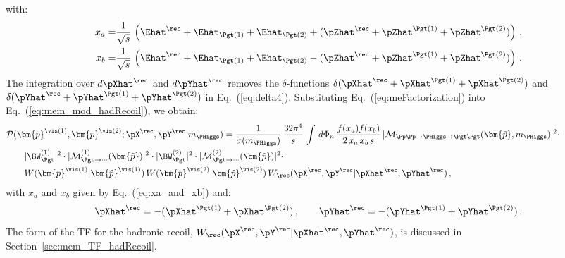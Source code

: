 with:
\begin{align}
x_{a} = & \frac{1}{\sqrt{s}} \, \left( \Ehat^{\rec} + \Ehat_{\Pgt(1)} +
\Ehat_{\Pgt(2)} + (\pZhat^{\rec} + \pZhat^{\Pgt(1)} +
\pZhat^{\Pgt(2)}) \right)
\, , \nonumber \\
x_{b} = & \frac{1}{\sqrt{s}} \, \left( \Ehat^{\rec} + \Ehat_{\Pgt(1)}
  + \Ehat_{\Pgt(2)} - (\pZhat^{\rec} + \pZhat^{\Pgt(1)} +
  \pZhat^{\Pgt(2)}) \right) \, .
\label{eq:xa_and_xb}
\end{align}
The integration over $d\pXhat^{\rec}$ and $d\pYhat^{\rec}$ removes the $\delta$-functions 
$\delta( \pXhat^{\rec} + \pXhat^{\Pgt(1)} + \pXhat^{\Pgt(2)} )$ and
$\delta( \pYhat^{\rec} + \pYhat^{\Pgt(1)} + \pYhat^{\Pgt(2)} )$ in Eq.~(\ref{eq:delta4}).
Substituting Eq.~(\ref{eq:meFactorization}) into Eq.~(\ref{eq:mem_mod_hadRecoil}), we obtain:
\begin{align}
&
\mathcal{P}(\bm{p}^{\vis(1)},\bm{p}^{\vis(2)};\pX^{\rec},\pY^{\rec}|m_{\PHiggs})
= \frac{1}{\sigma(m_{\PHiggs})} \, \frac{32\pi^{4}}{s} \, \int \,
 d\Phi_{n} \, \frac{f(x_{a}) f(x_{b})}{2 \, x_{a} \, x_{b} \, s} \, 
 \vert \mathcal{M}_{\Pp\Pp \to \PHiggs \to \Pgt\Pgt}(\bm{\tilde{p}},m_{\PHiggs}) \vert^{2} \cdot \hspace{2cm} \nonumber \\
& \qquad \vert \BW^{(1)}_{\Pgt} \vert^{2} \cdot \vert \mathcal{M}^{(1)}_{\Pgt\to\cdots}(\bm{\tilde{p}}) \vert^{2} 
 \cdot \vert \BW^{(2)}_{\Pgt} \vert^{2} \cdot \vert \mathcal{M}^{(2)}_{\Pgt\to\cdots}(\bm{\tilde{p}}) \vert^{2} \cdot \nonumber \\
& \qquad W(\bm{p}^{\vis(1)}|\bm{\hat{p}}^{\vis(1)}) \, W(\bm{p}^{\vis(2)}|\bm{\hat{p}}^{\vis(2)}) \, W_{\rec}( \pX^{\rec},\pY^{\rec} | \pXhat^{\rec},\pYhat^{\rec} ) \, ,
\label{eq:mem_with_hadRecoil}
\end{align}
with $x_{a}$ and $x_{b}$ given by Eq.~(\ref{eq:xa_and_xb}) and:
\begin{equation}
\pXhat^{\rec} = -(\pXhat^{\Pgt(1)} + \pXhat^{\Pgt(2)}) \, ,
\qquad \pYhat^{\rec} = -(\pYhat^{\Pgt(1)} + \pYhat^{\Pgt(2)}) \, .
\label{eq:xpXhat_and_pYhat}
\end{equation}
The form of the TF for the hadronic recoil, $W_{\rec}( \pX^{\rec},\pY^{\rec} | \pXhat^{\rec},\pYhat^{\rec} )$, is
discussed in Section~\ref{sec:mem_TF_hadRecoil}.

